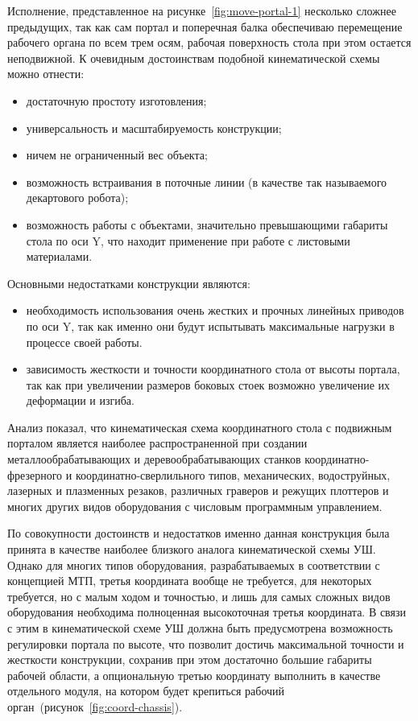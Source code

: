 Исполнение, представленное на рисунке~\cref{fig:move-portal-1} несколько сложнее предыдущих, так как сам портал и поперечная балка обеспечиваю перемещение рабочего органа по всем трем осям, рабочая поверхность стола при этом остается неподвижной. К очевидным достоинствам подобной кинематической схемы можно отнести:

\begin{itemize}
	\item достаточную простоту изготовления;
	\item универсальность и масштабируемость конструкции;
	\item ничем не ограниченный вес объекта;
	\item возможность встраивания в поточные линии (в качестве так называемого декартового робота);
	\item возможность работы с объектами, значительно превышающими габариты стола по оси Y, что находит применение при работе с листовыми материалами.
\end{itemize}

Основными недостатками конструкции являются:

\begin{itemize}
	\item необходимость использования очень жестких и прочных линейных приводов по оси Y, так как именно они будут испытывать максимальные нагрузки в процессе своей работы.
	
	\item зависимость жесткости и точности координатного стола от высоты портала, так как при увеличении размеров боковых стоек возможно увеличение их деформации и изгиба.
\end{itemize}

Анализ показал, что кинематическая схема координатного стола с подвижным порталом является наиболее распространенной при создании металлообрабатывающих и деревообрабатывающих станков координатно-фрезерного и координатно-сверлильного типов, механических, водоструйных, лазерных и плазменных резаков, различных граверов и режущих плоттеров и многих других видов оборудования с числовым программным управлением.

По совокупности достоинств и недостатков именно данная конструкция была принята в качестве наиболее близкого аналога кинематической схемы УШ. Однако для многих типов оборудования, разрабатываемых в соответствии с концепцией МТП, третья координата вообще не требуется, для некоторых требуется, но с малым ходом и точностью, и лишь для самых сложных видов оборудования необходима полноценная высокоточная третья координата. В связи с этим в кинематической схеме УШ должна быть предусмотрена возможность регулировки портала по высоте, что позволит достичь максимальной точности и жесткости конструкции, сохранив при этом достаточно большие габариты рабочей области, а опциональную третью координату выполнить в качестве отдельного модуля, на котором будет крепиться рабочий орган~(рисунок~\cref{fig:coord-chassis}).

